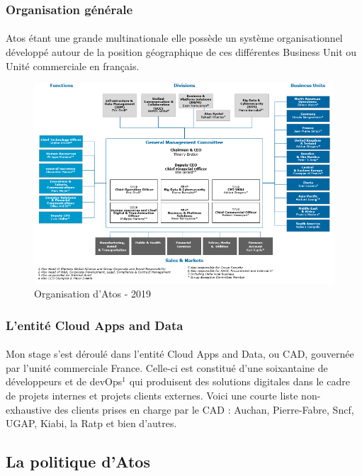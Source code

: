 \documentclass[12pt]{article}
\begin{document}
\begin {sloppypar}
\subsubsection{Organisation générale}
\paragraph{}
Atos étant une grande multinationale elle possède un système organisationnel développé 
autour de la position géographique de ces différentes Business Unit ou Unité commerciale
en français. 

\begin{figure}[h]
  \includegraphics[width=\textwidth] {orga_atos.png}
  \caption {Organisation d'Atos - 2019 }
\end{figure}

\subsubsection{L'entité Cloud Apps and Data}
\paragraph{}
Mon stage s'est déroulé dans l'entité Cloud Apps and Data, ou CAD, gouvernée par 
l'unité commerciale France. Celle-ci est constitué d'une soixantaine de développeurs et de devOps$^{1}$ qui produisent 
des solutions digitales dans le cadre de projets internes et projets clients externes.
Voici une courte liste non-exhaustive des clients prises en charge par le CAD : Auchan, Pierre-Fabre, Sncf, UGAP, Kiabi,
 la Ratp et bien d'autres.

\subsection{La politique d'Atos}

\end{sloppypar}
\end{document}

